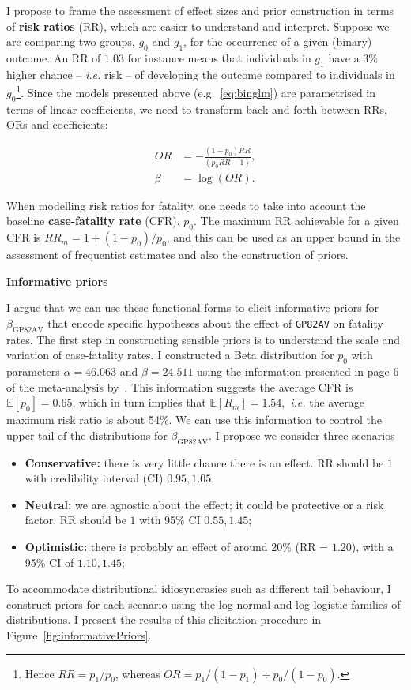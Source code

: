 I propose to frame the assessment of effect sizes and prior construction in terms of \textbf{risk ratios} (RR), which are easier to understand and interpret.
Suppose we are comparing two groups, $g_0$ and $g_1$, for the occurrence of a given (binary) outcome.
An RR  of $1.03$ for instance means that individuals in $g_1$ have a $3\%$ higher chance -- \textit{i.e.} risk --  of developing the outcome compared to individuals in $g_0$\footnote{Hence $RR = p_1/p_0$, whereas $OR = p_1/(1-p_1) \div p_0/(1-p_0)$.}.
Since the models presented above (e.g.~\ref{eq:binglm}) are parametrised in terms of linear coefficients, we need to transform back and forth between RRs, ORs and coefficients:

\begin{align}
\label{eq:ORRRa}
 OR &= -\frac{(1-p_0)RR}{(p_0 RR -1)}, \\
 \label{eq:ORRRb}
 \beta &= \log(OR).
\end{align}

When modelling risk ratios for fatality, one needs to take into account the baseline \textbf{case-fatality rate} (CFR), $p_0$.
The maximum RR achievable for a given CFR is $RR_m = 1 + (1-p_0)/p_0$, and this can be used as an upper bound in the assessment of frequentist estimates and also the construction of priors.

\textbf{Informative priors}

I argue that we can use these functional forms to elicit informative priors for $\beta_{\text{GP82AV}}$ that encode specific hypotheses about the effect of \verb|GP82AV| on fatality rates.
The first step in constructing sensible priors is to understand the scale and variation of case-fatality rates.
I constructed a Beta distribution for $p_0$  with parameters $\alpha = 46.063$ and $\beta = 24.511$ using the information presented in page 6 of the meta-analysis by~\cite{Nyakarahuka2016}.
This information suggests the average CFR is $\mathbb{E}[p_0]= 0.65$, which in turn implies that $\mathbb{E}[R_m] = 1.54$,~\textit{i.e.} the average maximum risk ratio is about 54\%.
We can use this information to control the upper tail of the distributions for $\beta_{\text{GP82AV}}$.
I propose we consider three scenarios
\begin{itemize}
 \item \textbf{Conservative:} there is very little chance there is an effect.
 RR should be $1$ with credibility interval (CI) $0.95, 1.05$;
 \item \textbf{Neutral:} we are agnostic about the effect; it could be protective or a risk factor.
 RR should be $1$ with 95\% CI $0.55, 1.45$;
 \item \textbf{Optimistic:} there is probably an effect of around $20$\% (RR = $1.20$), with a 95\% CI of $1.10, 1.45$;
\end{itemize}
To accommodate distributional idiosyncrasies such as different tail behaviour, I construct priors for each scenario using the log-normal and log-logistic families of distributions.
I present the results of this elicitation procedure in Figure~\ref{fig:informativePriors}.

